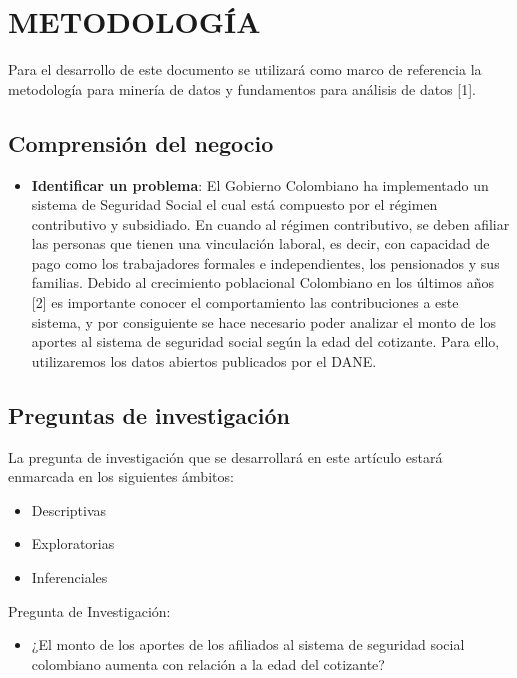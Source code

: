 \section{METODOLOGÍA}

 Para el desarrollo de este documento se utilizará como marco de referencia la metodología para minería de datos y fundamentos para análisis de datos [1].
 
  \subsection{Comprensión del negocio}
  
   \begin{itemize}
   	
   	\item \textbf{Identificar un problema}: El Gobierno Colombiano ha implementado un sistema de Seguridad Social el cual está compuesto por el régimen contributivo y subsidiado. En cuando al  régimen contributivo, se deben afiliar las personas que tienen una vinculación laboral, es decir, con capacidad de pago como los trabajadores formales e independientes, los pensionados y sus familias.  Debido al crecimiento poblacional Colombiano en los últimos años [2] es importante conocer el comportamiento las contribuciones a este sistema, y por consiguiente se hace necesario poder analizar el monto de los aportes al sistema de seguridad social según la edad del cotizante. Para ello, utilizaremos los datos abiertos publicados por el DANE.\\ 
   	
   \end{itemize} 
   
    \subsection{Preguntas de investigación}
    La pregunta de investigación que se desarrollará en este artículo estará enmarcada en los siguientes ámbitos:
    \begin{itemize}
    	\item Descriptivas 
    	\item Exploratorias
    	\item Inferenciales
    \end{itemize}
    
    Pregunta de Investigación: 
    \begin{itemize}
    	\item ¿El monto de los aportes de los afiliados al sistema de seguridad social colombiano aumenta con relación a la edad del cotizante?
    \end{itemize}
  
